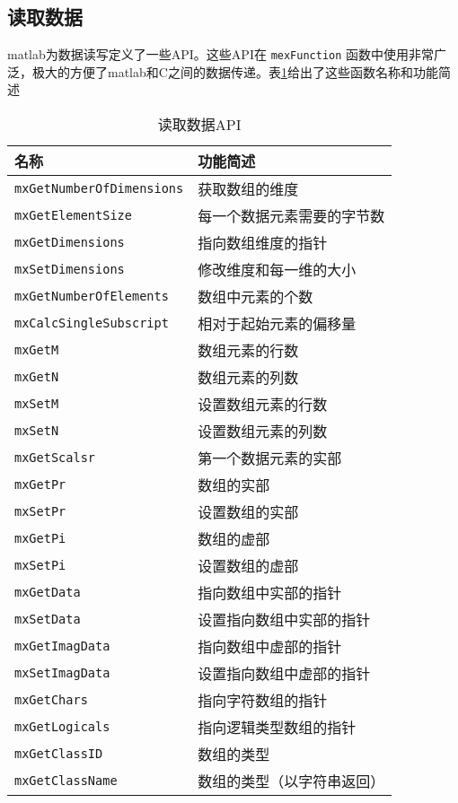 \documentclass[10pt,a4paper,UTF8]{article}
\begin{document}
\subsection{读取数据}
\label{sec:orgheadline5}


matlab为数据读写定义了一些API。这些API在 \texttt{mexFunction} 函数中使用非常广泛，极大的方便了matlab和C之间的数据传递。表\ref{tab:orgtable4}给出了这些函数名称和功能简述

\begin{table}[htb]
\caption{\label{tab:orgtable4}
读取数据API}
\centering
\begin{tabular}{ll}
\hline
名称 & 功能简述\\
\hline
\texttt{mxGetNumberOfDimensions} & 获取数组的维度\\
\texttt{mxGetElementSize} & 每一个数据元素需要的字节数\\
\texttt{mxGetDimensions} & 指向数组维度的指针\\
\texttt{mxSetDimensions} & 修改维度和每一维的大小\\
\texttt{mxGetNumberOfElements} & 数组中元素的个数\\
\texttt{mxCalcSingleSubscript} & 相对于起始元素的偏移量\\
\texttt{mxGetM} & 数组元素的行数\\
\texttt{mxGetN} & 数组元素的列数\\
\texttt{mxSetM} & 设置数组元素的行数\\
\texttt{mxSetN} & 设置数组元素的列数\\
\texttt{mxGetScalsr} & 第一个数据元素的实部\\
\texttt{mxGetPr} & 数组的实部\\
\texttt{mxSetPr} & 设置数组的实部\\
\texttt{mxGetPi} & 数组的虚部\\
\texttt{mxSetPi} & 设置数组的虚部\\
\texttt{mxGetData} & 指向数组中实部的指针\\
\texttt{mxSetData} & 设置指向数组中实部的指针\\
\texttt{mxGetImagData} & 指向数组中虚部的指针\\
\texttt{mxSetImagData} & 设置指向数组中虚部的指针\\
\texttt{mxGetChars} & 指向字符数组的指针\\
\texttt{mxGetLogicals} & 指向逻辑类型数组的指针\\
\texttt{mxGetClassID} & 数组的类型\\
\texttt{mxGetClassName} & 数组的类型（以字符串返回）\\

\end{tabular}
\end{table}
\end{document}
